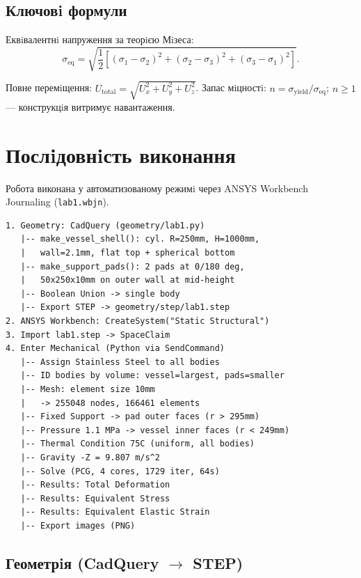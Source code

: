 \subsection{Ключовi формули}

Еквiвалентнi напруження за теорiєю Мiзеса:
\begin{equation}
  \sigma_{\mathrm{eq}} = \sqrt{\frac{1}{2}\left[
    (\sigma_1 - \sigma_2)^2 +
    (\sigma_2 - \sigma_3)^2 +
    (\sigma_3 - \sigma_1)^2
  \right]}.
\end{equation}

Повне перемiщення:
$U_{\mathrm{total}} = \sqrt{U_x^2 + U_y^2 + U_z^2}$.
Запас мiцностi:
$n = \sigma_{\mathrm{yield}} / \sigma_{\mathrm{eq}}$;
$n \geq 1$ --- конструкцiя витримує навантаження.

\section{Послiдовнiсть виконання}

Робота виконана у автоматизованому режимi через ANSYS Workbench Journaling (\texttt{lab1.wbjn}).

\begin{lstlisting}[style=scheme]
1. Geometry: CadQuery (geometry/lab1.py)
   |-- make_vessel_shell(): cyl. R=250mm, H=1000mm,
   |   wall=2.1mm, flat top + spherical bottom
   |-- make_support_pads(): 2 pads at 0/180 deg,
   |   50x250x10mm on outer wall at mid-height
   |-- Boolean Union -> single body
   |-- Export STEP -> geometry/step/lab1.step
2. ANSYS Workbench: CreateSystem("Static Structural")
3. Import lab1.step -> SpaceClaim
4. Enter Mechanical (Python via SendCommand)
   |-- Assign Stainless Steel to all bodies
   |-- ID bodies by volume: vessel=largest, pads=smaller
   |-- Mesh: element size 10mm
   |   -> 255048 nodes, 166461 elements
   |-- Fixed Support -> pad outer faces (r > 295mm)
   |-- Pressure 1.1 MPa -> vessel inner faces (r < 249mm)
   |-- Thermal Condition 75C (uniform, all bodies)
   |-- Gravity -Z = 9.807 m/s^2
   |-- Solve (PCG, 4 cores, 1729 iter, 64s)
   |-- Results: Total Deformation
   |-- Results: Equivalent Stress
   |-- Results: Equivalent Elastic Strain
   |-- Export images (PNG)
\end{lstlisting}

\subsection{Геометрiя (CadQuery $\to$ STEP)}

